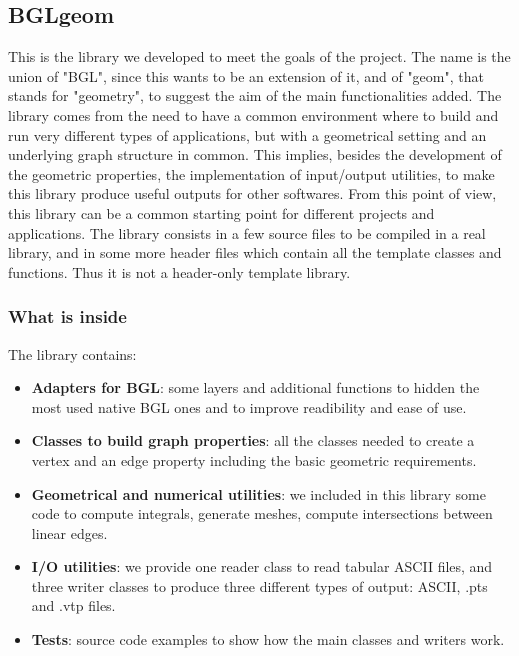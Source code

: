 \documentclass[10pt]{article} %
\begin{document}
	\subsection{BGLgeom}
	This is the library we developed to meet the goals of the project. The name is the union of "BGL", since this wants to be an extension of it, and of "geom", that stands for "geometry", to suggest the aim of the main functionalities added. 
	\newline\newline
	The library comes from the need to have a common environment where to build and run very different types of applications, but with a geometrical setting and an underlying graph structure in common. This implies, besides the development of the geometric properties, the implementation of input/output utilities, to make this library produce useful outputs for other softwares. From this point of view, this library can be a common starting point for different projects and applications.
	\newline\newline
	The library consists in a few source files to be compiled in a real library, and in some more header files which contain all the template classes and functions. Thus it is not a header-only template library.
	
	\subsubsection{What is inside}
	The library contains:
	\begin{itemize}
		\item \textbf{Adapters for BGL}: some layers and additional functions to hidden the most used native BGL ones and to improve readibility and ease of use.
		\item \textbf{Classes to build graph properties}: all the classes needed to create a vertex and an edge property including the basic geometric requirements.
		\item \textbf{Geometrical and numerical utilities}: we included in this library some code to compute integrals, generate meshes, compute intersections between linear edges.
		\item \textbf{I/O utilities}: we provide one reader class to read tabular ASCII files, and three writer classes to produce three different types of output: ASCII, .pts and .vtp files.
		\item \textbf{Tests}: source code examples to show how the main classes and writers work.
	\end{itemize}
	
\end{document}
